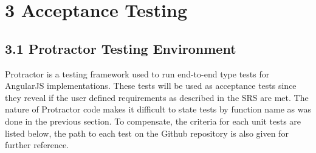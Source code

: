 \documentclass[]{article}
\begin{document}
\section{\textbf{3 Acceptance Testing}}\label{acceptance-testing}

\subsection{\textbf{3.1 Protractor Testing
Environment}}\label{protractor-testing-environment}

Protractor is a testing framework used to run end-to-end type tests for
AngularJS implementations. These tests will be used as acceptance tests
since they reveal if the user defined requirements as described in the
SRS are met. The nature of Protractor code makes it difficult to state
tests by function name as was done in the previous section. To
compensate, the criteria for each unit tests are listed below, the path
to each test on the Github repository is also given for further
reference.
\end{document}
